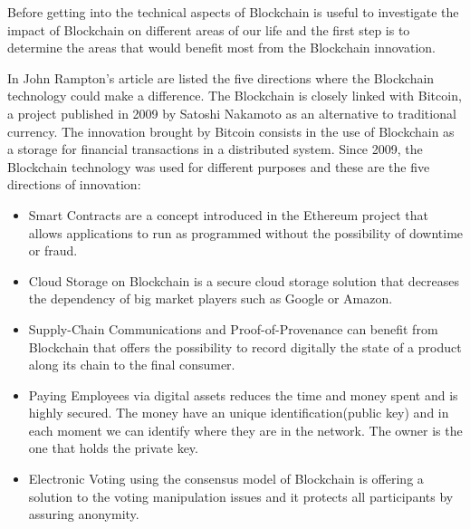 Before getting into the technical aspects of Blockchain is useful to investigate the impact of Blockchain on different areas of our life and the first step is to determine the areas that would benefit most from the Blockchain innovation.

In John Rampton's article \cite{5appforblock} are listed the five directions where the Blockchain technology could make a difference.
The Blockchain is closely linked with Bitcoin, a project published in 2009 by Satoshi Nakamoto as an alternative to traditional currency. The innovation brought by Bitcoin consists in the use of Blockchain as a storage for financial transactions in  a distributed system.
Since 2009, the Blockchain technology was used for different purposes and these are the five directions of innovation:
\begin{itemize}
	\item Smart Contracts are a concept introduced in the Ethereum project that allows applications to run as programmed without the possibility of downtime or fraud.
	\item Cloud Storage on Blockchain is a secure cloud storage solution that decreases the dependency of big market players such as Google or Amazon.
	\item Supply-Chain Communications and Proof-of-Provenance can benefit from Blockchain that offers the possibility to record digitally the state of a product along its chain to the final consumer.
	\item Paying Employees via digital assets reduces the time and money spent and is highly secured. The money have an unique identification(public key) and in each moment we can identify where they are in the network. The owner is the one that holds the private key.
	\item Electronic Voting using the consensus model of Blockchain is offering a solution to the voting manipulation issues and it protects all participants by assuring anonymity.
\end{itemize}